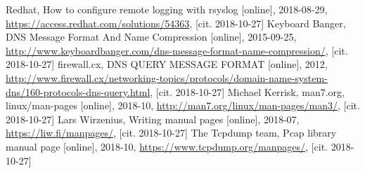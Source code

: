 \documentclass[11pt, a4paper, titlepage]{article}
\begin{document}
\begin{thebibliography}{9}
    Redhat,
    How to configure remote logging with rsyslog [online],
    2018-08-29,
    \url{https://access.redhat.com/solutions/54363},
    [cit. 2018-10-27]
    Keyboard Banger,
    DNS Message Format And Name Compression [online],
    2015-09-25,
    \url{http://www.keyboardbanger.com/dns-message-format-name-compression/},
    [cit. 2018-10-27]
    firewall.cx,
    DNS QUERY MESSAGE FORMAT [online],
    2012,
    \url{http://www.firewall.cx/networking-topics/protocols/domain-name-system-dns/160-protocols-dns-query.html},
    [cit. 2018-10-27]
    Michael Kerrisk, man7.org,
    linux/man-pages [online],
    2018-10,
    \url{http://man7.org/linux/man-pages/man3/},
    [cit. 2018-10-27]
    Lars Wirzenius,
    Writing manual pages [online],
    2018-07,
    \url{https://liw.fi/manpages/},
    [cit. 2018-10-27]
    The Tcpdump team,
    Pcap library manual page [online],
    2018-10,
    \url{https://www.tcpdump.org/manpages/},
    [cit. 2018-10-27]
\end{thebibliography}

\end{document}
